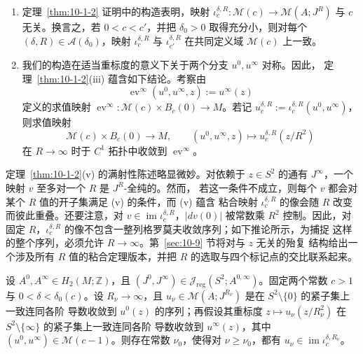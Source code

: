 \begin{remark}\label{rem:10-1-3}
\begin{enumerate}[label=\textnormal{(\roman*)}]
\item 定理~\ref{thm:10-1-2} 证明中的构造表明，映射
$\iota_c^{\delta,R}:\mathcal M(c)\to\mathcal M(A;J^R)$ 与 $c$ 无关。换言之，若
$0<c<c'$，并把 $\delta_0>0$ 取得充分小，则对每个
$(\delta,R)\in\mathcal A(\delta_0)$，映射 $\iota_c^{\delta,R}$ 与
$\iota_{c'}^{\delta,R}$ 在共同定义域 $\mathcal M(c)$ 上一致。

\item 我们的构造在适当重标度的意义下关于两个分支 $u^0,u^\infty$ 对称。因此，
定理~\ref{thm:10-1-2}(iii) 蕴含如下结论。考察由
\[
  \operatorname{ev}^\infty(u^0,u^\infty,z):=u^\infty(z)
\]
定义的求值映射
$\operatorname{ev}^\infty:\mathcal M(c)\times B_c(0)\to M$。若记
$u_c^{\delta,R}:=\iota_c^{\delta,R}(u^0,u^\infty)$，则求值映射
\[
  \mathcal M(c)\times B_c(0)\longrightarrow M,
  \qquad (u^0,u^\infty,z)\longmapsto u_c^{\delta,R}(z/R^2)
\]
在 $R\to\infty$ 时于 $C^1$ 拓扑中收敛到 $\operatorname{ev}^\infty$。
\end{enumerate}
\end{remark}

定理~\ref{thm:10-1-2}(v) 的满射性陈述略显微妙。对依赖于
$z\in S^2$ 的通有 $J^\infty$，一个映射 $v$ 至多对一个 $R$ 是 $J^R$-全纯的。然而，
若这一条件不成立，则每个 $v$ 都会对某个 $R$ 值的开子集满足 (v) 的条件，而 (v) 蕴含
粘合映射 $\iota_c^{\delta,R}$ 的像会随 $R$ 改变而彼此重叠。还要注意，对
$v\in\operatorname{im}\iota_c^{\delta,R}$，$|dv(0)|$ 被常数乘 $R^2$ 控制。因此，对固定
$R$，$\iota_c^{\delta,R}$ 的像不包含一整列格罗莫夫收敛序列；如下推论所示，为捕捉
这样的整个序列，必须允许 $R\to\infty$。第~\ref{sec:10-9} 节将对与 $z$ 无关的殆复
结构给出一个涉及所有 $R$ 值的粘合定理版本，并把 $R$ 的选取与四个标记点的交比联系起来。

\begin{corollary}\label{cor:10-1-4}
设 $A^0,A^\infty\in H_2(M;\mathbb Z)$，且
$(J^0,J^\infty)\in\mathcal J_{\mathrm{reg}}(S^2;A^{0,\infty})$。固定两个常数
$c>1$ 与 $0<\delta<\delta_0(c)$。设 $R_\nu\to\infty$，且
$u_\nu\in\mathcal M(A;J^{R_\nu})$ 是在 $S^2\setminus\{0\}$ 的紧子集上一致连同各阶
导数收敛到 $u^0(z)$ 的序列；再假设其重标度
$z\mapsto u_\nu(z/R_\nu^2)$ 在 $S^2\setminus\{\infty\}$ 的紧子集上一致连同各阶
导数收敛到 $u^\infty(z)$，其中 $(u^0,u^\infty)\in\mathcal M(c-1)$。则存在常数
$\nu_0$，使得对 $\nu\ge\nu_0$，都有
$u_\nu\in\operatorname{im}\iota_c^{\delta,R_\nu}$。
\end{corollary}

